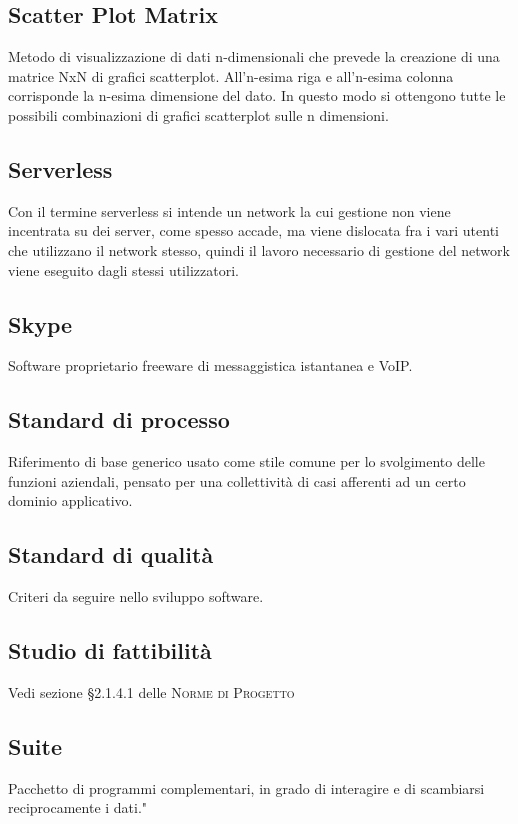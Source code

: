 \documentclass[../glossario.tex]{subfiles}
\begin{document}
\subsection*{Scatter Plot Matrix}
Metodo di visualizzazione di dati n-dimensionali che prevede la creazione di una matrice NxN di grafici scatterplot. All’n-esima riga e all’n-esima colonna corrisponde la n-esima dimensione del dato. In questo modo si ottengono tutte le possibili combinazioni di grafici scatterplot sulle n dimensioni.

\subsection*{Serverless} 
Con il termine serverless si intende un network la cui gestione non viene incentrata su dei server, come spesso accade, ma viene dislocata fra i vari utenti che utilizzano il network stesso, quindi il lavoro necessario di gestione del network viene eseguito dagli stessi utilizzatori.

\subsection*{Skype} 
Software proprietario freeware di messaggistica istantanea e VoIP.

\subsection*{Standard di processo} 
Riferimento di base generico usato come stile comune per lo svolgimento delle funzioni aziendali, pensato per una collettività di casi afferenti ad un certo dominio applicativo.

\subsection*{Standard di qualità} 
Criteri da seguire nello sviluppo software.

\subsection*{Studio di fattibilità}
Vedi sezione \S2.1.4.1 delle \textsc{Norme di Progetto}

\subsection*{Suite} 
Pacchetto di programmi complementari, in grado di interagire e di scambiarsi reciprocamente i dati."

    
\end{document}

